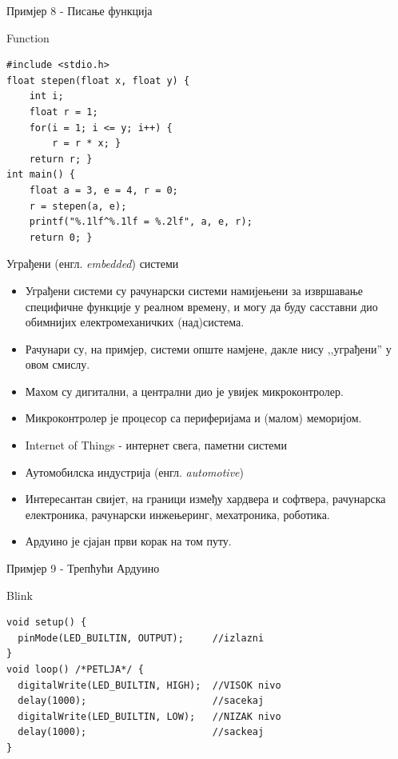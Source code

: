 \documentclass{beamer}
\begin{document}
\begin{frame}[fragile]{Примјер 8 - Писање функција}
\begin{block}{Function}
\begin{lstlisting}
#include <stdio.h>
float stepen(float x, float y) {
    int i;
    float r = 1;
    for(i = 1; i <= y; i++) {
        r = r * x; }
    return r; }
int main() {
    float a = 3, e = 4, r = 0;
    r = stepen(a, e);
    printf("%.1lf^%.1lf = %.2lf", a, e, r);
    return 0; }
\end{lstlisting}
\end{block}
\end{frame}

\begin{frame}{Уграђени (енгл. \textit{embedded}) системи}
\begin{itemize}
    \item Уграђени системи су рачунарски системи намијењени за извршавање специфичне функције у реалном времену, и могу да буду сасставни дио обимнијих електромеханичких (над)система.
    \item Рачунари су, на примјер, системи опште намјене, дакле нису ,,уграђени'' у овом смислу.
    \item Махом су дигитални, а централни дио је увијек микроконтролер.
    \item Микроконтролер је процесор са периферијама и (малом) меморијом.
    \item Internet of Things - интернет свега, паметни системи
    \item Аутомобилска индустрија (енгл. \textit{automotive})
    \item Интересантан свијет, на граници између хардвера и софтвера, рачунарска електроника, рачунарски инжењеринг, мехатроника, роботика.
    \item Ардуино је сјајан први корак на том путу.
\end{itemize}
\end{frame}

\begin{frame}[fragile]{Примјер 9 - Трепћући Ардуино}
\begin{block}{Blink}
\begin{lstlisting}
void setup() {
  pinMode(LED_BUILTIN, OUTPUT);     //izlazni
}
void loop() /*PETLJA*/ {
  digitalWrite(LED_BUILTIN, HIGH);  //VISOK nivo
  delay(1000);                      //sacekaj
  digitalWrite(LED_BUILTIN, LOW);   //NIZAK nivo
  delay(1000);                      //sackeaj
}
\end{lstlisting}
\end{block}
\end{frame}
\end{document}
